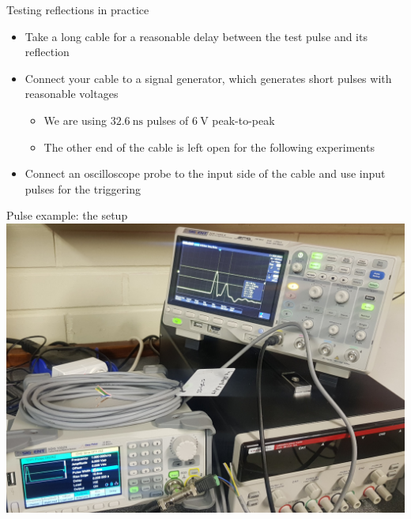\documentclass{beamer}
\begin{document}
\begin{frame}{Testing reflections in practice}
\begin{itemize}
 \item Take a long cable for a reasonable delay between the test pulse and its reflection
 \item Connect your cable to a signal generator, which generates short pulses with reasonable voltages
 \begin{itemize}
  \item We are using $\SI{32.6}{\nano\second}$ pulses of $\SI{6}{\volt}$ peak-to-peak
  \item The other end of the cable is left open for the following experiments
 \end{itemize}
 \item Connect an oscilloscope probe to the input side of the cable and use input pulses for the triggering
\end{itemize}
\centering{}
\end{frame}

\begin{frame}{Pulse example: the setup}
\centering\includegraphics[keepaspectratio, width=0.75\paperwidth]{pulse_setup.jpg}
\end{frame}
\end{document}
